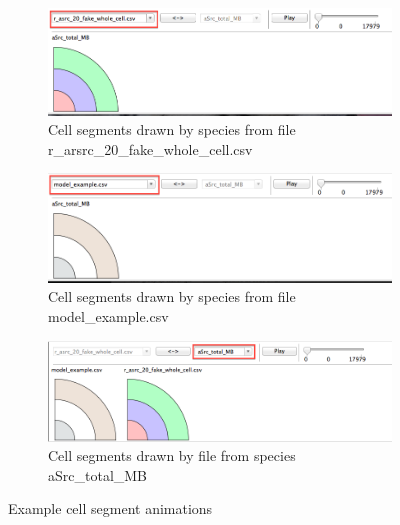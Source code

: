 \begin{figure}[h!]
    \centering
    \begin{subfigure}[b]{0.9\textwidth}
        \centering
        \includegraphics[width=\textwidth]{images/by_file_fake.png}
        \caption{Cell segments drawn by species from file r\_arsrc\_20\_fake\_whole\_cell.csv}
        \label{fig:cell_seg_file_fake}
    \end{subfigure}

    \begin{subfigure}[b]{0.9\textwidth}
        \centering
        \includegraphics[width=\textwidth]{images/by_file_model.png}
        \caption{Cell segments drawn by species from file model\_example.csv}
        \label{fig:cell_seg_file_model}
    \end{subfigure}

    \begin{subfigure}[b]{0.9\textwidth}
        \centering
        \includegraphics[width=\textwidth]{images/by_species_asrc.png}
        \caption{Cell segments drawn by file from species aSrc\_total\_MB}
        \label{fig:cell_seg_species}
    \end{subfigure}
    \caption{Example cell segment animations}
    \label{fig:cell_segments}
\end{figure}

